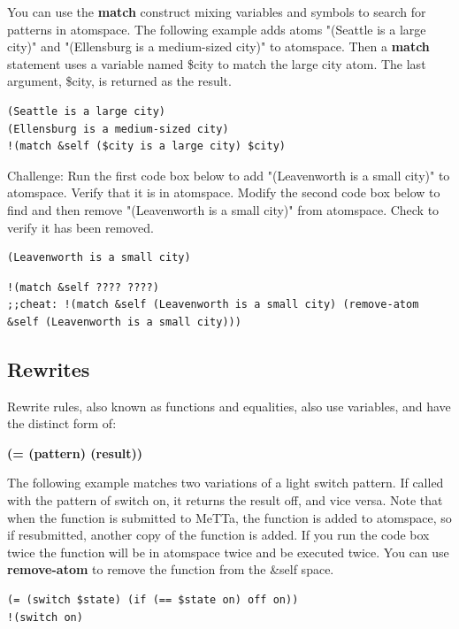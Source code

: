 \documentclass{article}
\begin{document}
You can use the \textbf{match} construct mixing variables and symbols to search for patterns in atomspace. The following example adds atoms "(Seattle is a large city)" and "(Ellensburg is a medium-sized city)" to atomspace. Then a \textbf{match} statement uses a variable named \$city to match the large city atom. The last argument, \$city, is returned as the result.
 
\begin{verbatim}
(Seattle is a large city)
(Ellensburg is a medium-sized city)
!(match &self ($city is a large city) $city)
\end{verbatim}

Challenge: Run the first code box below to add "(Leavenworth is a small city)" to atomspace. Verify that it is in atomspace. Modify the second code box below to find and then remove "(Leavenworth is a small city)" from atomspace. Check to verify it has been removed.

\begin{verbatim}
(Leavenworth is a small city)
\end{verbatim}

\begin{verbatim}
!(match &self ???? ????)
;;cheat: !(match &self (Leavenworth is a small city) (remove-atom &self (Leavenworth is a small city)))
\end{verbatim}

\subsection{Rewrites}

Rewrite rules, also known as functions and equalities, also use variables, and have the distinct form of:

\textbf{(= (pattern) (result))}

The following example matches two variations of a light switch pattern. If called with the pattern of switch on, it returns the result off, and vice versa. Note that when the function is submitted to MeTTa, the function is added to atomspace, so if resubmitted, another copy of the function is added. If you run the code box twice the function will be in atomspace twice and be executed twice. You can use \textbf{remove-atom} to remove the function from the \&self space.

\begin{verbatim}
(= (switch $state) (if (== $state on) off on))
!(switch on)
\end{verbatim}
\end{document}
